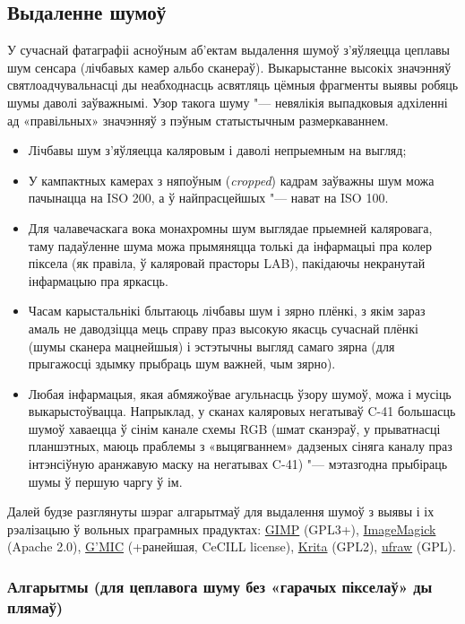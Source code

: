\documentclass[10pt, a5paper]{article}
\begin{document}
{\subsection*{Выдаленне шумоў}

У сучаснай фатаграфіі асноўным аб’ектам выдалення шумоў з’яўляецца цеплавы шум сенсара (лічбавых камер альбо сканераў). Выкарыстанне высокіх значэнняў святлоадчувальнасці ды неабходнасць асвятляць цёмныя фрагменты выявы робяць шумы даволі заўважнымі. Узор такога шуму "--- невялікія выпадковыя адхіленні ад «правільных» значэнняў з пэўным статыстычным размеркаваннем.

\begin{itemize}
  \item Лічбавы шум з’яўляецца каляровым і даволі непрыемным на выгляд;
  \item У кампактных камерах з няпоўным (\emph{cropped}) кадрам заўважны шум можа пачынацца на ISO 200, а ў найпрасцейшых "--- нават на ISO 100.
  \item Для чалавечаскага вока монахромны шум выглядае прыемней каляровага, таму падаўленне шума можа прымяняцца толькі да інфармацыі пра колер піксела (як правіла, ў каляровай прасторы LAB), пакідаючы некранутай інфармацыю пра яркасць.
  \item Часам карыстальнікі блытаюць лічбавы шум і зярно плёнкі, з якім зараз амаль не даводзіцца мець справу праз высокую якасць сучаснай плёнкі (шумы сканера мацнейшыя) і эстэтычны выгляд самаго зярна (для прыгажосці здымку прыбраць шум важней, чым зярно).
  \item Любая інфармацыя, якая абмяжоўвае агульнасць ўзору шумоў, можа і мусіць выкарыстоўвацца. Напрыклад, у сканах каляровых негатываў C-41  большасць шумоў хаваецца ў сінім канале схемы RGB (шмат сканэраў, у прыватнасці планшэтных, маюць праблемы з «выцягваннем» дадзеных сіняга каналу праз інтэнсіўную аранжавую маску на негатывах C-41) "--- мэтазгодна прыбіраць шумы ў першую чаргу ў ім.
\end{itemize}

Далей будзе разглянуты шэраг алгарытмаў для выдалення шумоў з выявы і іх рэалізацыю ў вольных праграмных прадуктах: \href{http://www.gimp.org/}{GIMP} (GPL3+), \href{http://www.imagemagick.org/}{ImageMagick} (Apache 2.0), \href{http://gmic.sourceforge.net/}{G'MIC} (+ранейшая, CeCILL license), \href{http://krita.org/}{Krita} (GPL2), \href{http://ufraw.sourceforge.net/}{ufraw} (GPL).

\subsubsection*{Алгарытмы (для цеплавога шуму без «гарачых пікселаў» ды плямаў)}

}
\end{document}
